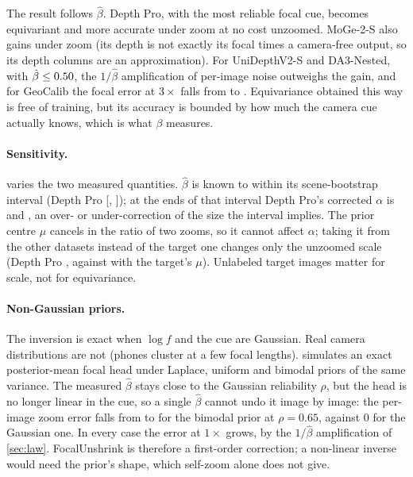 \documentclass[10pt,twocolumn,letterpaper]{article}
\begin{document}
The result follows $\hat\beta$. Depth Pro, with the most reliable focal cue, becomes equivariant and more
accurate under zoom at no cost unzoomed. MoGe-2-S also gains under zoom (its depth is not exactly its focal times
a camera-free output, so its depth columns are an approximation). For UniDepthV2-S and DA3-Nested, with
$\hat\beta\le0.50$, the $1/\hat\beta$ amplification of per-image noise outweighs the gain,
and for GeoCalib the focal error at $3\times$ falls from \GeocalibUnshrinkFocalThree{} to
\GeocalibUnshrinkFocalThreecorr. Equivariance obtained this way is free of training, but its accuracy is bounded by
how much the camera cue actually knows, which is what $\beta$ measures.



\paragraph{Sensitivity.}  varies the two measured quantities. $\hat\beta$ is known to
within its scene-bootstrap interval (Depth Pro \DepthproSensBetaCi{} [\DepthproSensBetaLo, \DepthproSensBetaHi]);
at the ends of that interval Depth Pro's corrected $\alpha$ is \DepthproSensAlphaAtHi{} and
\DepthproSensAlphaAtLo, an over- or under-correction of the size the interval implies. The prior centre $\mu$
cancels in the ratio of two zooms, so it cannot affect $\alpha$; taking it from the other datasets instead of the
target one changes only the unzoomed scale (Depth Pro \DepthproSensMuShiftScaleOne, against
\DepthproUnshrinkScaleOnecorr{} with the target's $\mu$). Unlabeled target images matter for scale, not for
equivariance.

\paragraph{Non-Gaussian priors.} The inversion is exact when $\log f$ and the cue are Gaussian. Real camera
distributions are not (phones cluster at a few focal lengths).  simulates an exact
posterior-mean focal head under Laplace, uniform and bimodal priors of the same variance. The measured $\hat\beta$
stays close to the Gaussian reliability $\rho$, but the head is no longer linear in the cue, so a single
$\hat\beta$ cannot undo it image by image: the per-image zoom error falls from \SimBimodalRhoSixFiveZerr{} to
\SimBimodalRhoSixFiveZerrc{} for the bimodal prior at $\rho=0.65$, against 0 for the Gaussian one. In every
case the error at $1\times$ grows, by the $1/\hat\beta$ amplification of \cref{sec:law}. FocalUnshrink is therefore
a first-order correction; a non-linear inverse would need the prior's shape, which self-zoom alone does not give.
\end{document}
